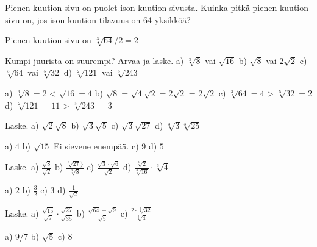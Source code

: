 \begin{tehtavasivu}
\begin{tehtava}
Pienen kuution sivu on puolet ison kuution sivusta. Kuinka pitkä pienen kuution sivu on, jos ison kuution tilavuus on 64 yksikköä? \\
\begin{vastaus}
Pienen kuution sivu on $\sqrt[3]{64}/2=2$ 
\end{vastaus}
\end{tehtava}

\begin{tehtava} Kumpi juurista on suurempi? Arvaa ja laske.
a) $\sqrt[3]{8}$ vai $\sqrt{16}$ \quad b)  $\sqrt{8}$ vai $2\sqrt{2}$  \quad c) $\sqrt[3]{64}$ vai $\sqrt[5]{32}$ \quad d) $\sqrt[2]{121}$ vai $\sqrt[5]{243}$ 
\begin{vastaus}
a) $\sqrt[3]{8}=2$   <   $\sqrt{16}=4$ \quad b) $\sqrt{8}=\sqrt{4}\sqrt{2}=2\sqrt{2}$ \quad = \quad $2\sqrt{2}$ \quad c) $\sqrt[3]{64}=4$   >   $\sqrt[5]{32}=2$ \quad d) $\sqrt[2]{121}=11$ \quad  > \quad $\sqrt[5]{243}=3$ 
\end{vastaus}
\end{tehtava}

\begin{tehtava} Laske. 
a) $\sqrt{2}\sqrt{8}$  \quad b)  $\sqrt{3}\sqrt{5}$ \quad c)  $\sqrt{3}\sqrt{27}$ \quad  d) $\sqrt[3]{3}\sqrt[3]{25} $
\begin{vastaus}
a) $4$ \quad b) $\sqrt{15}$  \quad Ei sievene enempää.  \quad c) $9$ \quad d) $5$
\end{vastaus}
\end{tehtava}


\begin{tehtava} Laske. 
a) $ \frac{\sqrt{8}}{\sqrt{2}}$  \quad b)   $ \frac{\sqrt[3]{27}\}}{\sqrt[3]{8}}$   \quad c)  $ \frac{\sqrt{3} \cdot \sqrt{6}}{\sqrt{2}}$ \quad d) $ \frac {\sqrt[3]{2}}{\sqrt[3]{16}} \cdot \sqrt[3]{4}$ 
\begin{vastaus}
a) $2$ \quad b) $\frac{3}{2}$  \quad c) $3$ \quad d) $\frac{1}{\sqrt{2}}$
\end{vastaus}
\end{tehtava}



\begin{tehtava} Laske. 
a) $ \frac{\sqrt{15}}{\sqrt{7}} \cdot  \frac{\sqrt{27}}{\sqrt{35}}$  \quad b)  $ \frac{\sqrt{64}-\sqrt{9}}{\sqrt{5}}$   \quad c)  $ \frac{2 \cdot \sqrt[3]{32}}{\sqrt[3]{4}}$ \quad 
\begin{vastaus}
a) $9/7$ \quad b) $\sqrt{5}$ \quad c) $8$ \quad
\end{vastaus}
\end{tehtava}


\end{tehtavasivu}
